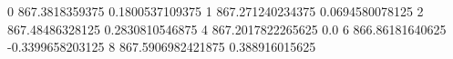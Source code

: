 0 867.3818359375 0.1800537109375
1 867.271240234375 0.0694580078125
2 867.48486328125 0.2830810546875
4 867.2017822265625 0.0
6 866.86181640625 -0.3399658203125
8 867.5906982421875 0.388916015625
